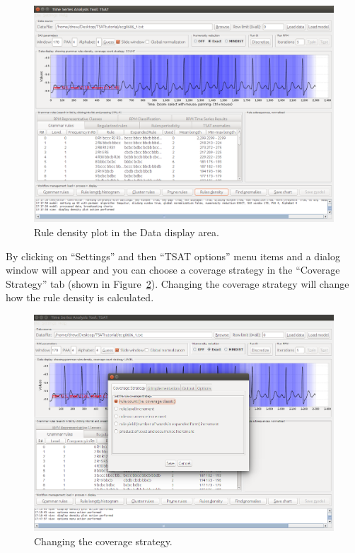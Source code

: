 \documentclass[letterpaper, 12pt]{article}
\begin{document}
\begin{figure}[H]
	\centering
	\includegraphics[width=\textwidth]{pictures/motifguide/RuleDensity}
	\caption{Rule density plot in the Data display area.}
	\label{fig:ruledensity}
\end{figure}



By clicking on ``Settings'' and then ``TSAT options'' menu items and a dialog window will appear and you can choose a coverage strategy in the ``Coverage Strategy'' tab (shown in Figure~\ref{fig:coveragestrategy}). Changing the coverage strategy will change how the rule density is calculated.

\begin{figure}[H]
	\centering
	\includegraphics[width=\textwidth]{pictures/motifguide/coveragestrategy}
	\caption{Changing the coverage strategy.}
	\label{fig:coveragestrategy}
\end{figure}
\end{document}
